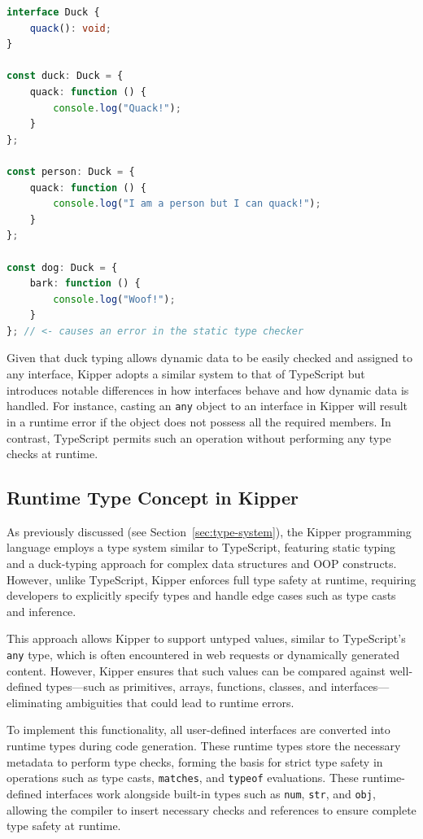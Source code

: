 \begin{lstlisting}[language=Typescript,caption=Example of duck typing in TypeScript,label=lst:implementation:javascriptducktyping]
interface Duck {
	quack(): void;
}

const duck: Duck = {
	quack: function () {
		console.log("Quack!");
	}
};

const person: Duck = {
	quack: function () {
		console.log("I am a person but I can quack!");
	}
};

const dog: Duck = {
	bark: function () {
		console.log("Woof!");
	}
}; // <- causes an error in the static type checker
\end{lstlisting}

Given that duck typing allows dynamic data to be easily checked and assigned to any interface, Kipper adopts a similar system to that of TypeScript but introduces notable differences in how interfaces behave and how dynamic data is handled. For instance, casting an \lstinline|any| object to an interface in Kipper will result in a runtime error if the object does not possess all the required members. In contrast, TypeScript permits such an operation without performing any type checks at runtime.

\subsection{Runtime Type Concept in Kipper}

As previously discussed (see Section~\ref{sec:type-system}), the Kipper programming language employs a type system similar to TypeScript, featuring static typing and a duck-typing approach for complex data structures and OOP constructs. However, unlike TypeScript, Kipper enforces full type safety at runtime, requiring developers to explicitly specify types and handle edge cases such as type casts and inference.

This approach allows Kipper to support untyped values, similar to TypeScript’s \lstinline|any| type, which is often encountered in web requests or dynamically generated content. However, Kipper ensures that such values can be compared against well-defined types—such as primitives, arrays, functions, classes, and interfaces—eliminating ambiguities that could lead to runtime errors.

To implement this functionality, all user-defined interfaces are converted into runtime types during code generation. These runtime types store the necessary metadata to perform type checks, forming the basis for strict type safety in operations such as type casts, \lstinline|matches|, and \lstinline|typeof| evaluations. These runtime-defined interfaces work alongside built-in types such as \lstinline|num|, \lstinline|str|, and \lstinline|obj|, allowing the compiler to insert necessary checks and references to ensure complete type safety at runtime.

